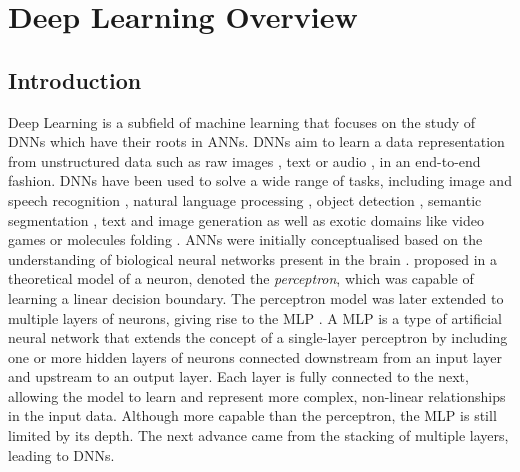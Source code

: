 \chapter{Deep Learning Overview}\label{chap:dlo}

\localtableofcontents

\section{Introduction}

Deep Learning is a subfield of machine learning that focuses on the study of
\acfp{DNN} which have their roots in \acfp{ANN}. \acp{DNN} aim to learn a data
representation from unstructured data such as raw images
\cite{DBLP:conf/nips/KrizhevskySH12}, text
\cite{DBLP:conf/emnlp/BudzianowskiV19} or audio
\cite{DBLP:journals/corr/HannunCCCDEPSSCN14}, in an end-to-end fashion.
\acp{DNN} have been used to solve a wide range of tasks, including image and
speech recognition
\cite{DBLP:conf/nips/KrizhevskySH12,DBLP:journals/corr/SimonyanZ14a,DBLP:conf/cvpr/HeZRS16,DBLP:journals/corr/HannunCCCDEPSSCN14,DBLP:conf/icassp/ChanJLV16,DBLP:conf/icml/AmodeiABCCCCCCD16},
natural language processing
\cite{DBLP:conf/emnlp/BudzianowskiV19,DBLP:conf/naacl/DevlinCLT19,DBLP:conf/nips/VaswaniSPUJGKP17},
object detection \cite{DBLP:conf/cvpr/RedmonDGF16,DBLP:conf/nips/RenHGS15},
semantic segmentation \cite{long2015fully,DBLP:conf/cvpr/LiuCSAHY019}, text and
image generation
\cite{goodfellow2020generative,karras2019style,DBLP:conf/emnlp/BudzianowskiV19}
as well as exotic domains like video games
\cite{silver2016mastering,silver2018general} or molecules folding
\cite{jumper2021highly}. \acp{ANN} were initially conceptualised based on the
understanding of biological neural networks present in the brain
\cite{mcculloch1943logical,hebb2005organization}.
\citeauthor{rosenblatt1958perceptron} proposed in
\cite{rosenblatt1958perceptron} a theoretical model of a neuron, denoted the
\emph{perceptron}, which was capable of learning a linear decision boundary. The
perceptron model was later extended to multiple layers of neurons, giving rise
to the \acf{MLP} \cite{rosenblatt1961principles,rumelhart1986learning}. A
\acl{MLP} is a type of artificial neural network that extends the concept of a
single-layer perceptron by including one or more hidden layers of neurons
connected downstream from an input layer and upstream to an output layer. Each
layer is fully connected to the next, allowing the model to learn and represent
more complex, non-linear relationships in the input data. Although more capable
than the perceptron, the \ac{MLP} is still limited by its depth. The next
advance came from the stacking of multiple layers, leading to \aclp{DNN}.\\

